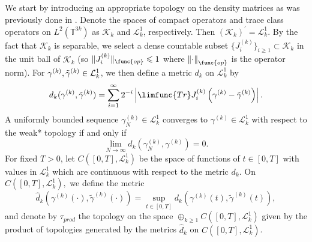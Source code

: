 \documentclass[12pt,letterpaper,leqno]{amsart}
\theoremstyle{plain}
\numberwithin{equation}{section}
\numberwithin{theorem}{section}
\numberwithin{proposition}{section}
\numberwithin{lemma}{section}
\numberwithin{corollary}{section}
\begin{document}
We start by introducing an appropriate topology on the density matrices as
was previously done in \cite{E-Y1, E-S-Y2,E-S-Y5,
E-S-Y3,Kirpatrick,TChenAndNP,ChenAnisotropic,Chen3DDerivation,C-H3Dto2D,C-H2/3}%
. Denote the spaces of compact operators and trace class operators on $%
L^{2}\left( \mathbb{T}^{3k}\right) $ as $\mathcal{K}_{k}$ and $\mathcal{L}%
_{k}^{1}$, respectively. Then $\left( \mathcal{K}_{k}\right) ^{\prime }=%
\mathcal{L}_{k}^{1}$. By the fact that $\mathcal{K}_{k}$ is separable, we
select a dense countable subset $\{J_{i}^{(k)}\}_{i\geqslant 1}\subset 
\mathcal{K}_{k}$ in the unit ball of $\mathcal{K}_{k}$ (so $\Vert
J_{i}^{(k)}\Vert _{\func{op}}\leqslant 1$ where $\left\Vert \cdot
\right\Vert _{\func{op}}$ is the operator norm). For $\gamma ^{(k)},\tilde{%
\gamma}^{(k)}\in \mathcal{L}_{k}^{1}$, we then define a metric $d_{k}$ on $%
\mathcal{L}_{k}^{1}$ by 
\begin{equation*}
d_{k}(\gamma ^{(k)},\tilde{\gamma}^{(k)})=\sum_{i=1}^{\infty
}2^{-i}\left\vert \limfunc{Tr}J_{i}^{(k)}\left( \gamma ^{(k)}-\tilde{\gamma}%
^{(k)}\right) \right\vert .
\end{equation*}%
A uniformly bounded sequence $\gamma _{N}^{(k)}\in \mathcal{L}_{k}^{1}$
converges to $\gamma ^{(k)}\in \mathcal{L}_{k}^{1}$ with respect to the
weak* topology if and only if 
\begin{equation*}
\lim_{N\rightarrow \infty }d_{k}(\gamma _{N}^{(k)},\gamma ^{(k)})=0.
\end{equation*}%
For fixed $T>0$, let $C\left( \left[ 0,T\right] ,\mathcal{L}_{k}^{1}\right) $
be the space of functions of $t\in \left[ 0,T\right] $ with values in $%
\mathcal{L}_{k}^{1}$ which are continuous with respect to the metric $d_{k}.$
On $C\left( \left[ 0,T\right] ,\mathcal{L}_{k}^{1}\right) ,$ we define the
metric 
\begin{equation*}
\hat{d}_{k}(\gamma ^{(k)}\left( \cdot \right) ,\tilde{\gamma}^{(k)}\left(
\cdot \right) )=\sup_{t\in \left[ 0,T\right] }d_{k}(\gamma ^{(k)}\left(
t\right) ,\tilde{\gamma}^{(k)}\left( t\right) ),
\end{equation*}%
and denote by $\tau _{prod}$ the topology on the space $\oplus _{k\geqslant
1}C\left( \left[ 0,T\right] ,\mathcal{L}_{k}^{1}\right) $ given by the
product of topologies generated by the metrics $\hat{d}_{k}$ on $C\left( %
\left[ 0,T\right] ,\mathcal{L}_{k}^{1}\right) $.
\end{document}
